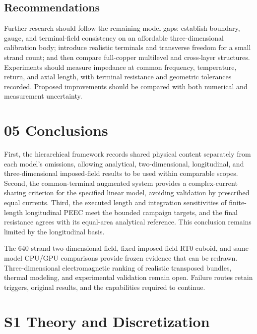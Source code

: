 \documentclass[journal,10pt]{IEEEtran}
\begin{document}
\subsection*{Recommendations}
\hypertarget{04.recommendations.heading}{}
Further research should follow the remaining model gaps: establish boundary, gauge, and terminal-field consistency on an affordable three-dimensional calibration body; introduce realistic terminals and transverse freedom for a small strand count; and then compare full-copper multilevel and cross-layer structures. Experiments should measure impedance at common frequency, temperature, return, and axial length, with terminal resistance and geometric tolerances recorded. Proposed improvements should be compared with both numerical and measurement uncertainty.


\FloatBarrier
\section*{05 Conclusions}
\hypertarget{chapter-05}{}
First, the hierarchical framework records shared physical content separately from each model’s omissions, allowing analytical, two-dimensional, longitudinal, and three-dimensional imposed-field results to be used within comparable scopes. Second, the common-terminal augmented system provides a complex-current sharing criterion for the specified linear model, avoiding validation by prescribed equal currents. Third, the executed length and integration sensitivities of finite-length longitudinal PEEC meet the bounded campaign targets, and the final resistance agrees with its equal-area analytical reference. This conclusion remains limited by the longitudinal basis.


The 640-strand two-dimensional field, fixed imposed-field RT0 cuboid, and same-model CPU/GPU comparisons provide frozen evidence that can be redrawn. Three-dimensional electromagnetic ranking of realistic transposed bundles, thermal modeling, and experimental validation remain open. Failure routes retain triggers, original results, and the capabilities required to continue.


\FloatBarrier
\section*{S1 Theory and Discretization}
\hypertarget{chapter-S1}{}
\end{document}
